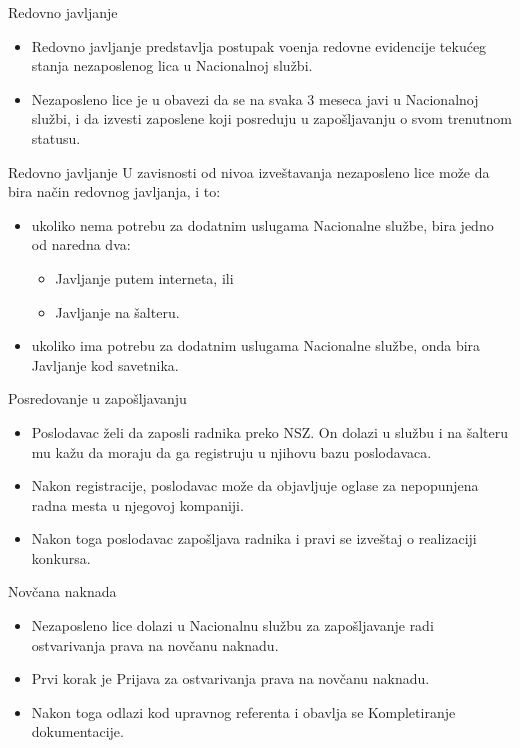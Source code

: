 \documentclass[11pt]{beamer}
\begin{document}
\begin{frame}{Redovno javljanje}
	\begin{itemize}
		\item Redovno javljanje predstavlja postupak vo\dj enja redovne evidencije teku\' ceg stanja nezaposlenog lica u Nacionalnoj slu\v zbi.
		\item Nezaposleno lice je u obavezi da se na svaka 3 meseca javi u Nacionalnoj slu\v zbi, i da izvesti zaposlene koji posreduju u zapo\v sljavanju o svom trenutnom statusu.
	\end{itemize}
\end{frame}

\begin{frame}{Redovno javljanje}
	U zavisnosti od nivoa izve\v stavanja nezaposleno lice mo\v ze da bira na\v cin redovnog javljanja, i to:
	\begin{itemize}
		\item ukoliko nema potrebu za dodatnim uslugama Nacionalne slu\v zbe, bira jedno od naredna dva:
		\begin{itemize}
			\item Javljanje putem interneta, ili
			\item Javljanje na \v salteru.
		\end{itemize}
		
		\item ukoliko ima potrebu za dodatnim uslugama Nacionalne slu\v zbe, onda bira Javljanje kod savetnika.
	\end{itemize}
\end{frame}

\begin{frame}{Posredovanje u zapo\v sljavanju}
	\begin{itemize}
		\item Poslodavac \v zeli da zaposli radnika preko NSZ. On dolazi u slu\v zbu i na \v salteru mu ka\v zu da moraju da ga registruju u njihovu bazu poslodavaca. \item Nakon registracije, poslodavac mo\v ze da objavljuje oglase za nepopunjena radna mesta u njegovoj kompaniji.
		\item Nakon toga poslodavac zapo\v sljava radnika i pravi se izve\v staj o realizaciji konkursa.
	\end{itemize}
	
\end{frame}

\begin{frame}{Nov\v cana naknada}
	\begin{itemize}
		\item Nezaposleno lice dolazi u Nacionalnu slu\v zbu za zapo\v sljavanje radi ostvarivanja prava na nov\v canu naknadu. 
		\item Prvi korak je Prijava za ostvarivanja prava na nov\v canu naknadu.
		\item Nakon toga odlazi kod upravnog referenta i obavlja se Kompletiranje dokumentacije.
	\end{itemize}
\end{frame}
\end{document}
